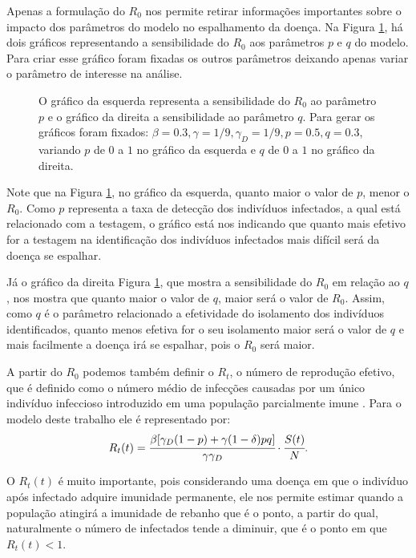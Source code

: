 \documentclass[12pt]{article}
\begin{document}
Apenas a formulação do $R_0$ nos permite retirar informações importantes sobre o impacto dos parâmetros do modelo no espalhamento da doença. Na Figura \ref{sensR_0}, há dois gráficos representando a sensibilidade do $R_0$ aos parâmetros $p$ e $q$ do modelo. Para criar esse gráfico foram fixadas os outros parâmetros deixando apenas variar o parâmetro de interesse na análise.


\begin{figure}[h!]
    \centering
    
    \caption{O gráfico da esquerda representa a sensibilidade do $R_0$ ao parâmetro $p$ e o gráfico da direita a sensibilidade ao parâmetro $q$. Para gerar os gráficos foram fixados: $\beta = 0.3, \gamma = 1/9, \gamma_D = 1/9, p = 0.5, q = 0.3 $, variando $p$ de $0$ a $1$ no gráfico da esquerda e $q$ de $0$ a $1$ no gráfico da direita.}
    \label{sensR_0}
\end{figure}

Note que na Figura \ref{sensR_0}, no gráfico da esquerda, quanto maior o valor de $p$, menor o $R_0$. Como $p$ representa a taxa de detecção dos indivíduos infectados, a qual está relacionado com a testagem, o gráfico está nos indicando que quanto mais efetivo for a testagem na identificação dos indivíduos infectados mais difícil será da doença se espalhar.

Já o gráfico da direita Figura \ref{sensR_0}, que mostra a sensibilidade do $R_0$ em relação ao $q$, nos mostra que quanto maior o valor de $q$, maior será o valor de $R_0$. Assim, como $q$ é o parâmetro relacionado a efetividade do isolamento dos indivíduos identificados, quanto menos efetiva for o seu isolamento maior será o valor de $q$ e mais facilmente a doença irá se espalhar, pois o $R_0$ será maior.

A partir do $R_0$ podemos também definir o $R_t$, o número de reprodução efetivo, que é definido como o número médio de infecções causadas por um único indivíduo infeccioso  introduzido em uma população parcialmente imune \cite{randolph2020herd}. Para o modelo deste trabalho ele é representado por: 
$$R_t(t) = \cfrac{\beta [ \gamma_D (1-p) + \gamma (1 - \delta)pq]}{\gamma \gamma_D}\cdot \cfrac{S(t)}{N}.$$

O $R_t (t)$ é muito importante, pois considerando uma doença em que o indivíduo após infectado adquire imunidade permanente, ele nos permite estimar quando a população atingirá a imunidade de rebanho que é o ponto, a partir do qual, naturalmente o número de infectados tende a diminuir, que é o ponto em que $R_t (t) < 1$.
\end{document}

